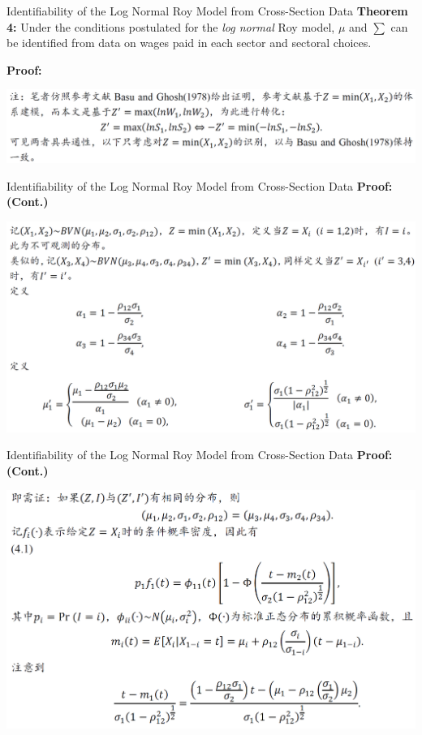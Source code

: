 \documentclass{beamer}
\begin{document}
\begin{frame}{Identifiability of the Log Normal Roy Model from Cross-Section Data}
	\textbf{Theorem 4:} Under the conditions postulated for the \textit{log normal} Roy model, $\mu$ and $\sum $ can be identified from data on wages paid in each sector and sectoral choices.
\bigskip

\pause
	\textbf{Proof:}
	
	\includegraphics[scale=0.5]{theorem4_0}
\end{frame}
\begin{frame}{Identifiability of the Log Normal Roy Model from Cross-Section Data}
	\textbf{Proof:(Cont.)}
	
	\includegraphics[scale=0.5]{theorem4_1}
\end{frame}
\begin{frame}{Identifiability of the Log Normal Roy Model from Cross-Section Data}
	\textbf{Proof:(Cont.)}
	
	\includegraphics[scale=0.5]{theorem4_2}
\end{frame}
\end{document}
